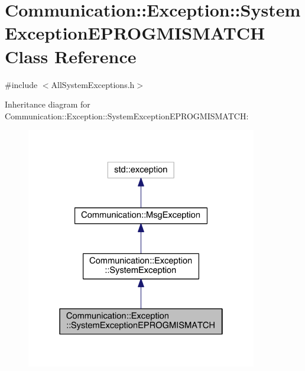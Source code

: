 \hypertarget{class_communication_1_1_exception_1_1_system_exception_e_p_r_o_g_m_i_s_m_a_t_c_h}{}\section{Communication\+:\+:Exception\+:\+:System\+Exception\+E\+P\+R\+O\+G\+M\+I\+S\+M\+A\+T\+C\+H Class Reference}
\label{class_communication_1_1_exception_1_1_system_exception_e_p_r_o_g_m_i_s_m_a_t_c_h}


{\ttfamily \#include $<$All\+System\+Exceptions.\+h$>$}



Inheritance diagram for Communication\+:\+:Exception\+:\+:System\+Exception\+E\+P\+R\+O\+G\+M\+I\+S\+M\+A\+T\+C\+H\+:\nopagebreak
\begin{figure}[H]
\begin{center}
\leavevmode
\includegraphics[width=286pt]{class_communication_1_1_exception_1_1_system_exception_e_p_r_o_g_m_i_s_m_a_t_c_h__inherit__graph}
\end{center}
\end{figure}


